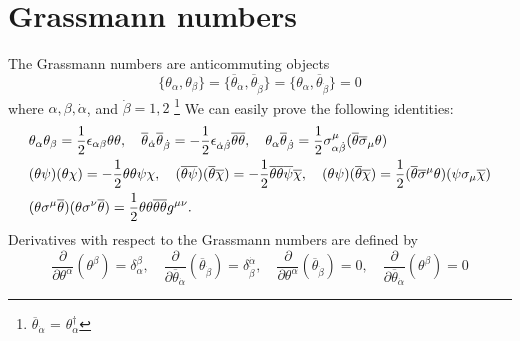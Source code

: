 \documentclass[12pt]{report}
\begin{document}
\section{Grassmann numbers}
The Grassmann numbers are anticommuting objects
\begin{equation}
\{\theta_{\alpha}, \theta_{\beta}\} = \{\overline{\theta}_{\dot{\alpha}}, \overline{\theta}_{\dot{\beta}}\} = \{\theta_{\alpha}, \overline{\theta}_{\dot{\beta}}\} = 0
\end{equation}
where $\alpha, \beta, \dot{\alpha}$, and $\dot{\beta} = 1, 2$ \footnote{$\overline{\theta}_{\dot{\alpha}}$ = $\theta_{\alpha}^{\dagger}$ }
We can easily prove the following identities:
\begin{align}
&\theta_{\alpha} \theta_{\beta} = \frac{1}{2} \epsilon_{\alpha \beta} \theta \theta, \quad 
\overline{\theta}_{\dot{\alpha}} \overline{\theta}_{\dot{\beta}} = -\frac{1}{2} \epsilon_{\dot{\alpha} \dot{\beta}} \overline{\theta} \overline{\theta}, \quad 
\theta_{\alpha} \overline{\theta}_{\dot{\beta}} = \frac{1}{2} \sigma^{\mu}_{\alpha \dot{\beta}} (\overline{\theta} \overline{\sigma}_{\mu} \theta) \notag \\
& (\theta \psi)(\theta \chi) = - \frac{1}{2}\theta \theta \psi \chi, \quad 
(\overline{\theta} \overline{\psi})(\overline{\theta} \overline{\chi}) = - \frac{1}{2} \overline{\theta} \overline{\theta} \overline{\psi} \overline{\chi}, \quad 
(\theta \psi)(\overline{\theta} \overline{\chi}) = \frac{1}{2}(\overline{\theta} \overline{\sigma}^{\mu} \theta)(\psi \sigma_{\mu} \overline{\chi}) \notag \\
& (\theta \sigma^{\mu} \overline{\theta})(\theta \sigma^{\nu} \overline{\theta}) = \frac{1}{2} \theta \theta \overline{\theta} \overline{\theta} g^{\mu \nu} .
\end{align}
Derivatives with respect to the Grassmann numbers are defined by
\begin{equation}
\frac{\partial}{\partial \theta^{\alpha}}(\theta^{\beta}) = \delta^{\beta}_{\alpha}, \quad
\frac{\partial}{\partial \overline{\theta}_{\dot{\alpha}}}(\overline{\theta}_{\dot{\beta}}) = \delta^{\dot{\alpha}}_{\dot{\beta}}, \quad 
\frac{\partial}{\partial \theta^{\alpha}}(\overline{\theta}_{\dot{\beta}}) = 0, \quad 
\frac{\partial}{\partial \overline{\theta}_{\dot{\alpha}}}(\theta^{\beta}) = 0
\end{equation}
\end{document}
